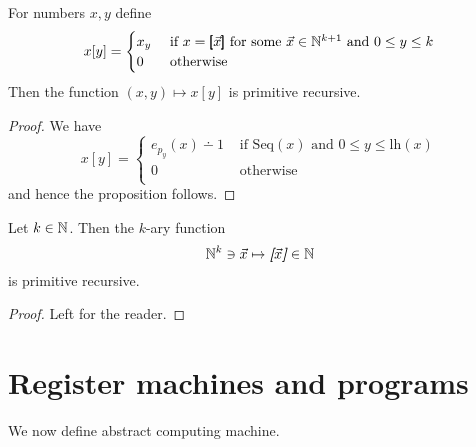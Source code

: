 \documentclass[10pt]{amsart}
\begin{document}
\begin{proposition}\label{proposition:sequence_element_access_is_primitive_recursive}
	For numbers $x, y$ define
	$$x[y] = \begin{cases}
			x_y & \mbox{ if }x = \pmb{[}\vec{x}\pmb{]}\mbox{ for some }\vec{x}\in {\mathbb N}^{k + 1}\mbox{ and }0 \leq y \leq k \\
			0   & \mbox{ otherwise }                                                                                     \\
		\end{cases}$$
	Then the function $(x,y) \mapsto x[y]$ is primitive recursive.
\end{proposition}
\begin{proof}
	We have
	$$x[y] = \begin{cases}
			e_{p_y}(x) \dotminus 1 & \mbox{ if }\mathrm{Seq}(x)\mbox{ and }0\leq y \leq \mathrm{lh}(x) \\
			0                      & \mbox{ otherwise }                                                \\
		\end{cases}$$
	and hence the proposition follows.
\end{proof}

\begin{proposition}\label{proposition:sequence_encoding_is_primitive_recursive_function}
	Let $k\in {\mathbb N}$. Then the $k$-ary function
	$${\mathbb N}^k\ni \vec{x} \mapsto \emph{\textbf{[}}\vec{x}\emph{\textbf{]}}\in {\mathbb N}$$
	is primitive recursive.
\end{proposition}
\begin{proof}
	Left for the reader.
\end{proof}

\section{Register machines and programs}
\noindent
We now define abstract computing machine.
\end{document}
